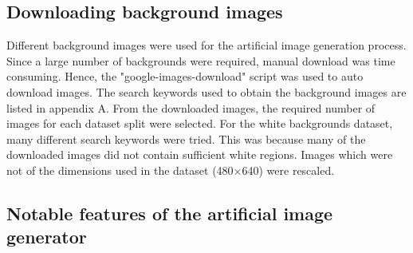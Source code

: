 \subsection{Downloading background images}
Different background images were used for the artificial image generation process. Since a large number of backgrounds were required, manual download was time consuming. Hence, the "google-images-download" \cite{image_downloader} script was used to auto download images. The search keywords used to obtain the background images are listed in appendix A. From the downloaded images, the required number of images for each dataset split were selected. For the white backgrounds dataset, many different search keywords were tried. This was because many of the downloaded images did not contain sufficient white regions. Images which were not of the dimensions used in the dataset (480$\times$640) were rescaled.

	
\subsection{Notable features of the artificial image generator}

